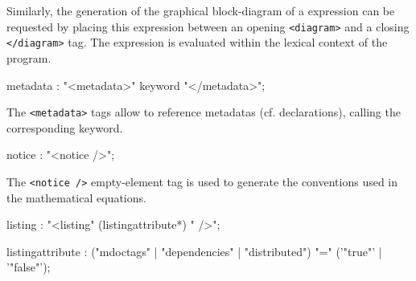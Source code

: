 Similarly, the generation of the graphical block-diagram of a \faust expression can be requested by placing this expression between an opening \lstinline'<diagram>' and a closing \lstinline'</diagram>' tag. The expression is evaluated within the lexical context of the \faust program.


\begin{rail}
metadata : "<metadata>" keyword "</metadata>";
\end{rail}

The \lstinline'<metadata>' tags allow to reference \faust metadatas (cf. declarations), calling the corresponding keyword.


\begin{rail}
notice : "<notice />";
\end{rail}

The \lstinline'<notice />' empty-element tag is used to generate the conventions used in the mathematical equations.
% 

\begin{rail}
listing : "<listing" (listingattribute*) " />";
\end{rail}

\begin{rail}
listingattribute : ("mdoctags" | "dependencies" | "distributed") "=" ('"true"' | '"false"');
\end{rail}

